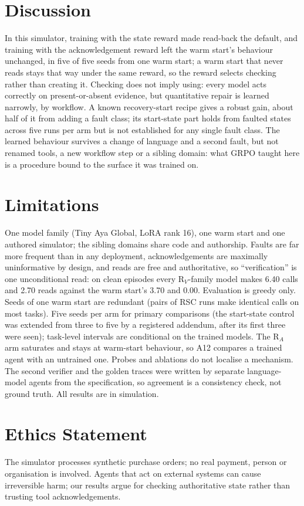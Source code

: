 \documentclass[11pt]{article}
\newcommand{\RV}{R$_V$}
\newcommand{\RA}{R$_A$}
\begin{document}
\section{Discussion}

In this simulator, training with the state reward made read-back the default, and training with the acknowledgement reward left the warm start's behaviour unchanged, in five of five seeds from one warm start; a warm start that never reads stays that way under the same reward, so the reward selects checking rather than creating it. Checking does not imply using: every model acts correctly on present-or-absent evidence, but quantitative repair is learned narrowly, by workflow. A known recovery-start recipe gives a robust gain, about half of it from adding a fault class; its start-state part holds from faulted states across five runs per arm but is not established for any single fault class. The learned behaviour survives a change of language and a second fault, but not renamed tools, a new workflow step or a sibling domain: what GRPO taught here is a procedure bound to the surface it was trained on.

\section*{Limitations}

One model family (Tiny Aya Global, LoRA rank 16), one warm start and one authored simulator; the sibling domains share code and authorship. Faults are far more frequent than in any deployment, acknowledgements are maximally uninformative by design, and reads are free and authoritative, so ``verification'' is one unconditional read: on clean episodes every \RV{}-family model makes 6.40 calls and 2.70 reads against the warm start's 3.70 and 0.00. Evaluation is greedy only. Seeds of one warm start are redundant (pairs of RSC runs make identical calls on most tasks). Five seeds per arm for primary comparisons (the start-state control was extended from three to five by a registered addendum, after its first three were seen); task-level intervals are conditional on the trained models. The \RA{} arm saturates and stays at warm-start behaviour, so A12 compares a trained agent with an untrained one. Probes and ablations do not localise a mechanism. The second verifier and the golden traces were written by separate language-model agents from the specification, so agreement is a consistency check, not ground truth. All results are in simulation.

\section*{Ethics Statement}

The simulator processes synthetic purchase orders; no real payment, person or organisation is involved. Agents that act on external systems can cause irreversible harm; our results argue for checking authoritative state rather than trusting tool acknowledgements.




\appendix

\end{document}
